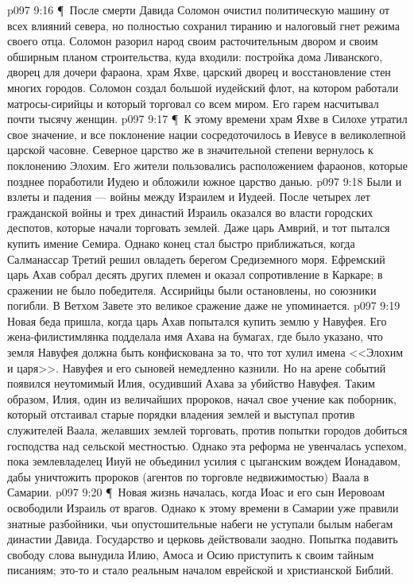 \vs p097 9:16 \P\ После смерти Давида Соломон очистил политическую машину от всех влияний севера, но полностью сохранил тиранию и налоговый гнет режима своего отца. Соломон разорил народ своим расточительным двором и своим обширным планом строительства, куда входили: постройка дома Ливанского, дворец для дочери фараона, храм Яхве, царский дворец и восстановление стен многих городов. Соломон создал большой иудейский флот, на котором работали матросы\hyp{}сирийцы и который торговал со всем миром. Его гарем насчитывал почти тысячу женщин.
\vs p097 9:17 \P\ К этому времени храм Яхве в Силохе утратил свое значение, и все поклонение нации сосредоточилось в Иевусе в великолепной царской часовне. Северное царство же в значительной степени вернулось к поклонению Элохим. Его жители пользовались расположением фараонов, которые позднее поработили Иудею и обложили южное царство данью.
\vs p097 9:18 Были и взлеты и падения --- войны между Израилем и Иудеей. После четырех лет гражданской войны и трех династий Израиль оказался во власти городских деспотов, которые начали торговать землей. Даже царь Амврий, и тот пытался купить имение Семира. Однако конец стал быстро приближаться, когда Салманассар Третий решил овладеть берегом Средиземного моря. Ефремский царь Ахав собрал десять других племен и оказал сопротивление в Каркаре; в сражении не было победителя. Ассирийцы были остановлены, но союзники погибли. В Ветхом Завете это великое сражение даже не упоминается.
\vs p097 9:19 Новая беда пришла, когда царь Ахав попытался купить землю у Навуфея. Его жена\hyp{}филистимлянка подделала имя Ахава на бумагах, где было указано, что земля Навуфея должна быть конфискована за то, что тот хулил имена <<Элохим и царя>>. Навуфея и его сыновей немедленно казнили. Но на арене событий появился неутомимый Илия, осудивший Ахава за убийство Навуфея. Таким образом, Илия, один из величайших пророков, начал свое учение как поборник, который отстаивал старые порядки владения землей и выступал против служителей Ваала, желавших землей торговать, против попытки городов добиться господства над сельской местностью. Однако эта реформа не увенчалась успехом, пока землевладелец Ииуй не объединил усилия с цыганским вождем Ионадавом, дабы уничтожить пророков (агентов по торговле недвижимостью) Ваала в Самарии.
\vs p097 9:20 \P\ Новая жизнь началась, когда Иоас и его сын Иеровоам освободили Израиль от врагов. Однако к этому времени в Самарии уже правили знатные разбойники, чьи опустошительные набеги не уступали былым набегам династии Давида. Государство и церковь действовали заодно. Попытка подавить свободу слова вынудила Илию, Амоса и Осию приступить к своим тайным писаниям; это\hyp{}то и стало реальным началом еврейской и христианской Библий.
